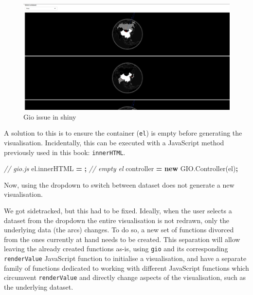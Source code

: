 \documentclass[
]{krantz}
\makeatletter
\newenvironment{Shaded}{\begin{snugshade}}{\end{snugshade}}
\newcommand{\AttributeTok}[1]{\textcolor[rgb]{0.61,0.61,0.61}{#1}}
\newcommand{\CommentTok}[1]{\textcolor[rgb]{0.37,0.37,0.37}{\textit{#1}}}
\newcommand{\KeywordTok}[1]{\textcolor[rgb]{0.27,0.27,0.27}{\textbf{#1}}}
\newcommand{\NormalTok}[1]{#1}
\newcommand{\OperatorTok}[1]{\textcolor[rgb]{0.43,0.43,0.43}{\textbf{#1}}}
\newcommand{\StringTok}[1]{\textcolor[rgb]{0.5,0.5,0.5}{#1}}
\newcommand{\VariableTok}[1]{\textcolor[rgb]{0,0,0}{#1}}
\newenvironment{kframe}{%
\medskip{}
\setlength{\fboxsep}{.8em}
 \def\at@end@of@kframe{}%
 \ifinner\ifhmode%
  \def\at@end@of@kframe{\end{minipage}}%
  \begin{minipage}{\columnwidth}%
 \fi\fi%
 \def\FrameCommand##1{\hskip\@totalleftmargin \hskip-\fboxsep
 \colorbox{shadecolor}{##1}\hskip-\fboxsep
     \hskip-\linewidth \hskip-\@totalleftmargin \hskip\columnwidth}%
 \MakeFramed {\advance\hsize-\width
   \@totalleftmargin\z@ \linewidth\hsize
   \@setminipage}}%
 {\par\unskip\endMakeFramed%
 \at@end@of@kframe}
\renewenvironment{Shaded}{\begin{kframe}}{\end{kframe}}
\makeatother
\begin{document}
\begin{figure}[t]

{\centering \includegraphics[width=1\linewidth]{images/gio-shiny-error} 

}

\caption{Gio issue in shiny}\label{fig:gio-shiny-error}
\end{figure}

A solution to this is to ensure the container (\texttt{el}) is empty before generating the visualisation. Incidentally, this can be executed with a JavaScript method previously used in this book: \texttt{innerHTML}.

\begin{Shaded}
\begin{Highlighting}[]
\CommentTok{// gio.js}
\VariableTok{el}\NormalTok{.}\AttributeTok{innerHTML} \OperatorTok{=} \StringTok{\textquotesingle{}\textquotesingle{}}\OperatorTok{;} \CommentTok{// empty el}
\NormalTok{controller }\OperatorTok{=} \KeywordTok{new} \VariableTok{GIO}\NormalTok{.}\AttributeTok{Controller}\NormalTok{(el)}\OperatorTok{;}
\end{Highlighting}
\end{Shaded}

Now, using the dropdown to switch between dataset does not generate a new visualisation.

We got sidetracked, but this had to be fixed. Ideally, when the user selects a dataset from the dropdown the entire visualisation is not redrawn, only the underlying data (the arcs) changes. To do so, a new set of functions divorced from the ones currently at hand needs to be created. This separation will allow leaving the already created functions as-is, using \texttt{gio} and its corresponding \texttt{renderValue} JavaScript function to initialise a visualisation, and have a separate family of functions dedicated to working with different JavaScript functions which circumvent \texttt{renderValue} and directly change aspects of the visualisation, such as the underlying dataset.
\end{document}
